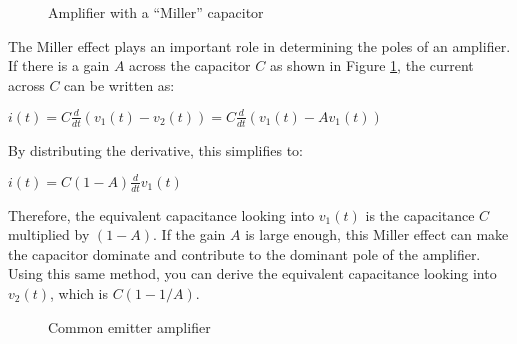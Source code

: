 \documentclass{article}
\begin{document}
\thispagestyle{plain}

\name

	\begin{figure}[!htb]
		
		\centerline{\box\graph}
		\caption{Amplifier with a ``Miller'' capacitor}
		\label{miller}
	\end{figure}

The Miller effect plays an important role in determining the poles of an amplifier. If there is a gain $A$ across the capacitor $C$ as shown in Figure \ref{miller}, the current across $C$ can be written as:

\begin{center}
	$i(t) = C\frac{d}{dt}(v_1(t)-v_2(t)) = C\frac{d}{dt}(v_1(t)-Av_1(t))$
\end{center}

\begin{flushleft}
By distributing the derivative, this simplifies to:
\end{flushleft}

\begin{center}
	$i(t) = C(1-A)\frac{d}{dt}v_1(t)$
\end{center}

\begin{flushleft}
Therefore, the equivalent capacitance looking into $v_1(t)$ is the capacitance $C$ multiplied by $(1-A)$. If the gain $A$ is large enough, this Miller effect can make the capacitor dominate and contribute to the dominant pole of the amplifier. Using this same method, you can derive the equivalent capacitance looking into $v_2(t)$, which is $C(1-1/A)$.
\end{flushleft}

\begin{figure}[!htb]
		
		\centerline{\box\graph}
		\caption{Common emitter amplifier}
		\label{prelab}
	\end{figure}
\end{document}
